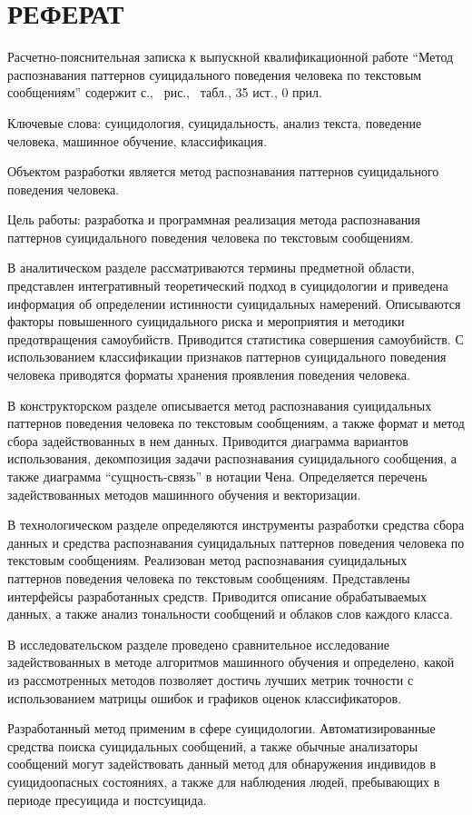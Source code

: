\section*{РЕФЕРАТ}

Расчетно-пояснительная записка к выпускной квалификационной работе ``Метод распознавания паттернов суицидального поведения человека по текстовым сообщениям'' содержит \pageref{LastPage} с., \totalfigures\ рис., \totaltables\ табл., 35 ист., 0 прил.

Ключевые слова: суицидология, суицидальность, анализ текста, поведение человека, машинное обучение, классификация.

Объектом разработки является метод распознавания паттернов суицидального поведения человека.

Цель работы: разработка и программная реализация метода распознавания паттернов суицидального поведения человека по текстовым сообщениям.

В аналитическом разделе рассматриваются термины предметной области, представлен интегративный теоретический подход в суицидологии и приведена информация об определении истинности суицидальных намерений. 
Описываются факторы повышенного суицидального риска и мероприятия и методики предотвращения самоубийств. Приводится статистика совершения самоубийств.
С использованием классификации признаков паттернов суицидального поведения человека приводятся форматы хранения проявления поведения человека.

В конструкторском разделе описывается метод распознавания суицидальных паттернов поведения человека по текстовым сообщениям, а также формат и метод сбора задействованных в нем данных. 
Приводится диаграмма вариантов использования, декомпозиция задачи распознавания суицидального сообщения, а также диаграмма ``сущность-связь'' в нотации Чена. 
Определяется перечень задействованных методов машинного обучения и векторизации.

В технологическом разделе определяются инструменты разработки средства сбора данных и средства распознавания суицидальных паттернов поведения человека по текстовым сообщениям.
Реализован метод распознавания суицидальных паттернов поведения человека по текстовым сообщениям. 
Представлены интерфейсы разработанных средств. 
Приводится описание обрабатываемых данных, а также анализ тональности сообщений и облаков слов каждого класса.

В исследовательском разделе проведено сравнительное исследование задействованных в методе алгоритмов машинного обучения и определено, какой из рассмотренных методов позволяет достичь лучших метрик точности с использованием матрицы ошибок и графиков оценок классификаторов.

Разработанный метод применим в сфере суицидологии. 
Автоматизированные средства поиска суицидальных сообщений, а также обычные анализаторы сообщений могут задействовать данный метод для обнаружения индивидов в суицидоопасных состояниях, а также для наблюдения людей, пребывающих в периоде пресуицида и постсуицида.

\pagebreak